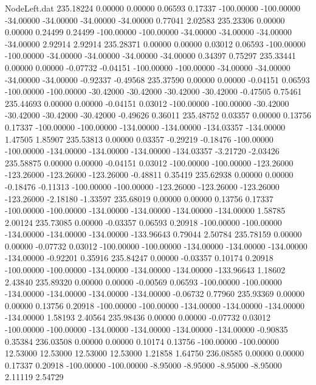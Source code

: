 \begin{filecontents}{NodeLeft.dat}
 235.18224    0.00000    0.00000     0.06593    0.17337 -100.00000 -100.00000  -34.00000  -34.00000  -34.00000  -34.00000    0.77041    2.02583
 235.23306    0.00000    0.00000     0.24499    0.24499 -100.00000 -100.00000  -34.00000  -34.00000  -34.00000  -34.00000    2.92914    2.92914
 235.28371    0.00000    0.00000     0.03012    0.06593 -100.00000 -100.00000  -34.00000  -34.00000  -34.00000  -34.00000    0.34397    0.75297
 235.33441    0.00000    0.00000    -0.07732   -0.04151 -100.00000 -100.00000  -34.00000  -34.00000  -34.00000  -34.00000   -0.92337   -0.49568
 235.37590    0.00000    0.00000    -0.04151    0.06593 -100.00000 -100.00000  -30.42000  -30.42000  -30.42000  -30.42000   -0.47505    0.75461
 235.44693    0.00000    0.00000    -0.04151    0.03012 -100.00000 -100.00000  -30.42000  -30.42000  -30.42000  -30.42000   -0.49626    0.36011
 235.48752    0.03357    0.00000     0.13756    0.17337 -100.00000 -100.00000 -134.00000 -134.00000 -134.03357 -134.00000    1.47505    1.85907
 235.53813    0.00000    0.03357    -0.29219   -0.18476 -100.00000 -100.00000 -134.00000 -134.00000 -134.00000 -134.03357   -3.21720   -2.03426
 235.58875    0.00000    0.00000    -0.04151    0.03012 -100.00000 -100.00000 -123.26000 -123.26000 -123.26000 -123.26000   -0.48811    0.35419
 235.62938    0.00000    0.00000    -0.18476   -0.11313 -100.00000 -100.00000 -123.26000 -123.26000 -123.26000 -123.26000   -2.18180   -1.33597
 235.68019    0.00000    0.00000     0.13756    0.17337 -100.00000 -100.00000 -134.00000 -134.00000 -134.00000 -134.00000    1.58785    2.00124
 235.73085    0.00000   -0.03357     0.06593    0.20918 -100.00000 -100.00000 -134.00000 -134.00000 -134.00000 -133.96643    0.79044    2.50784
 235.78159    0.00000    0.00000    -0.07732    0.03012 -100.00000 -100.00000 -134.00000 -134.00000 -134.00000 -134.00000   -0.92201    0.35916
 235.84247    0.00000   -0.03357     0.10174    0.20918 -100.00000 -100.00000 -134.00000 -134.00000 -134.00000 -133.96643    1.18602    2.43840
 235.89320    0.00000    0.00000    -0.00569    0.06593 -100.00000 -100.00000 -134.00000 -134.00000 -134.00000 -134.00000   -0.06732    0.77960
 235.93369    0.00000    0.00000     0.13756    0.20918 -100.00000 -100.00000 -134.00000 -134.00000 -134.00000 -134.00000    1.58193    2.40564
 235.98436    0.00000    0.00000    -0.07732    0.03012 -100.00000 -100.00000 -134.00000 -134.00000 -134.00000 -134.00000   -0.90835    0.35384
 236.03508    0.00000    0.00000     0.10174    0.13756 -100.00000 -100.00000   12.53000   12.53000   12.53000   12.53000    1.21858    1.64750
 236.08585    0.00000    0.00000     0.17337    0.20918 -100.00000 -100.00000   -8.95000   -8.95000   -8.95000   -8.95000    2.11119    2.54729

\end{filecontents}
